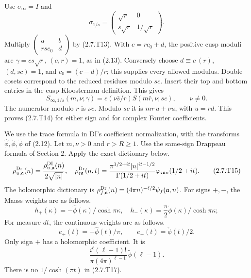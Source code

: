 Use $\sigma_\infty=I$ and
\[
\sigma_{1/s}=
 \begin{pmatrix}\sqrt r&0\\s\sqrt r&1/\sqrt r\end{pmatrix}.
\tag{2.7.T13}\label{p1:eq:2.7.T13}
\]
Multiply $\begin{pmatrix}a&b\\rsc_0&d\end{pmatrix}$ by (2.7.T13). With $c=rc_0+d$, the positive cusp moduli are $\gamma=cs\sqrt r$, $(c,r)=1$, as in (2.13).
Conversely choose $d\equiv c\ (r)$, $(d,sc)=1$, and
$c_0=(c-d)/r$; this supplies every allowed modulus. Double cosets
correspond to the reduced residues modulo $sc$. Insert their top and bottom entries in the cusp Kloosterman definition. This gives
\[
S_{\infty,1/s}(m,\nu;\gamma)
 =e(\nu\bar s/r)S(m\bar r,\nu;sc),
\qquad \nu\ne0.
\tag{2.7.T14}\label{p1:eq:2.7.T14}
\]
The numerator modulo $r$ is $\nu c$. Modulo $sc$ it is $m\bar r\,u+\nu\bar u$, with $u=r\bar d$.
This proves (2.7.T14) for either sign and for complex Fourier
coefficients.

We use the trace formula in DI's coefficient normalization, with the transforms $\widehat\phi,\check\phi,\widetilde\phi$ of (2.12).
Let $m,\nu>0$ and $r>R\ge1$. Use the same-sign Drappeau formula of Section 2. Apply the exact dictionary below.
\[
\rho^{\rm Dr}_{u,\mathfrak a}(n)=\frac{\rho^{\rm DI}_{u,\mathfrak a}(n)}
                                      {2\sqrt{|n|}},\quad
\rho^{\rm Dr}_{\mathfrak c\mathfrak a}(n,t)=
 \frac{\pi^{1/2+it}|n|^{it-1/2}}{\Gamma(1/2+it)}
                    \varphi_{\mathfrak c\mathfrak a n}(1/2+it).
\tag{2.7.T15}\label{p1:eq:2.7.T15}
\]
The holomorphic dictionary is
$\rho^{\rm Dr}_{f,\mathfrak a}(n)=(4\pi n)^{-\ell/2}
\psi_f(\mathfrak a,n)$.
For signs $+,-$, the Maass weights are as follows.
\[
h_+(\kappa)=-\widehat\phi(\kappa)/\cosh\pi\kappa,\quad
h_-(\kappa)=\frac\pi2\check\phi(\kappa)/\cosh\pi\kappa;
\tag{2.7.T16}\label{p1:eq:2.7.T16}
\]
For measure $dt$, the continuous weights are as follows.
\[
e_+(t)=-\widehat\phi(t)/\pi,\qquad e_-(t)=\check\phi(t)/2.
\tag{2.7.T17}\label{p1:eq:2.7.T17}
\]
Only sign $+$ has a holomorphic coefficient. It is
\[
\frac{i^\ell(\ell-1)!}{\pi(4\pi)^{\ell-1}}\,
                                 \widetilde\phi(\ell-1).
\tag{2.7.T18}\label{p1:eq:2.7.T18}
\]
There is no $1/\cosh(\pi t)$ in (2.7.T17).

